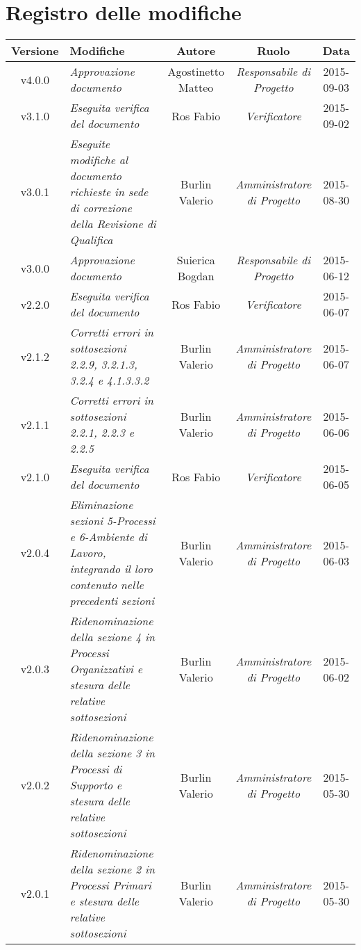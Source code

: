 \newpage
\section*{Registro delle modifiche}

\begin{table}[h]
\centering
\begin{tabular}{|c|p{}|c|c|c|}
	\toprule
		\textbf{Versione} & \textbf{Modifiche} & \textbf{Autore} & \textbf{Ruolo} & \textbf{Data} \\
	\midrule
	\midrule
		v4.0.0 & \textit{Approvazione documento} & Agostinetto Matteo & \textit{Responsabile di Progetto} & 2015-09-03\\
	\midrule
		v3.1.0 & \textit{Eseguita verifica del documento} & Ros Fabio & \textit{Verificatore} & 2015-09-02\\
	\midrule
		v3.0.1 & \textit{Eseguite modifiche al documento richieste in sede di correzione della Revisione di Qualifica} & Burlin Valerio & \textit{Amministratore di Progetto} & 2015-08-30\\
	\midrule
		v3.0.0 & \textit{Approvazione documento} & Suierica Bogdan & \textit{Responsabile di Progetto} & 2015-06-12\\
	\midrule
		v2.2.0 & \textit{Eseguita verifica del documento} & Ros Fabio & \textit{Verificatore} & 2015-06-07\\
	\midrule
		v2.1.2 & \textit{Corretti errori in sottosezioni 2.2.9, 3.2.1.3, 3.2.4 e 4.1.3.3.2} & Burlin Valerio & \textit{Amministratore di Progetto} & 2015-06-07\\
	\midrule
		v2.1.1 & \textit{Corretti errori in sottosezioni 2.2.1, 2.2.3 e 2.2.5} & Burlin Valerio & \textit{Amministratore di Progetto} & 2015-06-06\\
	\midrule
		v2.1.0 & \textit{Eseguita verifica del documento} & Ros Fabio & \textit{Verificatore} & 2015-06-05\\
	\midrule
		v2.0.4 & \textit{Eliminazione sezioni 5-Processi e 6-Ambiente di Lavoro, integrando il loro contenuto nelle precedenti sezioni} & Burlin Valerio & \textit{Amministratore di Progetto} & 2015-06-03\\
	\midrule
		v2.0.3 & \textit{Ridenominazione della sezione 4 in Processi Organizzativi e stesura delle relative sottosezioni} & Burlin Valerio & \textit{Amministratore di Progetto} & 2015-06-02\\
	\midrule
		v2.0.2 & \textit{Ridenominazione della sezione 3 in Processi di Supporto e stesura delle relative sottosezioni} & Burlin Valerio & \textit{Amministratore di Progetto} & 2015-05-30\\
	\midrule
		v2.0.1 & \textit{Ridenominazione della sezione 2 in Processi Primari e stesura delle relative sottosezioni} & Burlin Valerio & \textit{Amministratore di Progetto} & 2015-05-30\\
	\bottomrule
\end{tabular}
\end{table}
